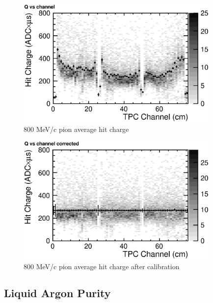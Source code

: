 \begin{figure}[htbp]
 \begin{center}
  \includegraphics[width=100mm]{fig/PionQvsCh.eps}
 \end{center}
 \caption{800 MeV/c pion average hit charge}
 \label{fig:PionQvsCh}
\end{figure}

\begin{figure}[htbp]
 \begin{center}
  \includegraphics[width=100mm]{fig/PionQcvsCh.eps}
 \end{center}
 \caption{800 MeV/c pion average hit charge after calibration}
 \label{fig:PionQcvsCh}
\end{figure}


\subsection{Liquid Argon Purity}

